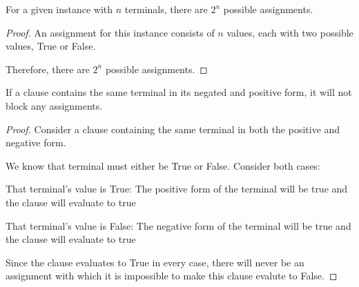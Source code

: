 \documentclass[manuscript]{acmart}
\begin{document}
    \begin{lemma}        
        For a given instance with $n$ terminals, there are $2^n$ possible assignments.
    \end{lemma}
    \begin{proof}
        An assignment for this instance consists of $n$ values, each with two possible
        values, True or False.

        Therefore, there are $2^n$ possible assignments.
    \end{proof}

    \begin{lemma}
        If a clause contains the same terminal in its negated and positive form, it will
        not block any assignments.
    \end{lemma}
    \begin{proof}

        Consider a clause containing the same terminal in both the positive and
        negative form.

        We know that terminal must either be True or False. Consider both cases:

        That terminal's value is True:
        The positive form of the terminal will be true and the clause will evaluate to true

        That terminal's value is False:
        The negative form of the terminal will be true and the clause will evaluate to true

        Since the clause evaluates to True in every case, there will never be an 
        assignment with which it is impossible to make this clause evalute to False.
    \end{proof}




\end{document}
